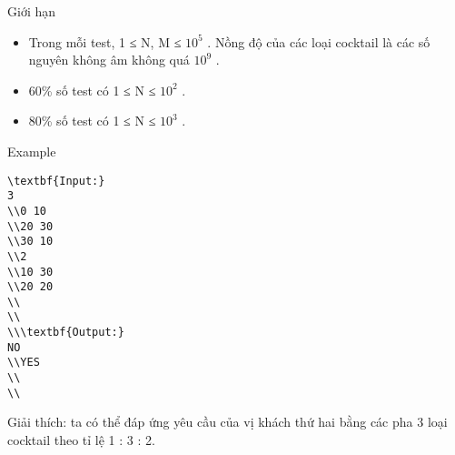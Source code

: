 Giới hạn
\begin{itemize}
	\item     Trong mỗi test, 1 ≤ N, M ≤ $10^{5}$    . Nồng độ của các loại cocktail là các số nguyên không âm không quá $10^{9}$    .   
	\item     60\% số test có 1 ≤ N ≤ $10^{2}$    .   
	\item     80\% số test có 1 ≤ N ≤ $10^{3}$    .   
\end{itemize}
Example
\begin{verbatim}
\textbf{Input:}
3
\\0 10
\\20 30 
\\30 10
\\2
\\10 30
\\20 20
\\
\\
\\\textbf{Output:}
NO
\\YES
\\
\\\end{verbatim}

Giải thích: ta có thể đáp ứng yêu cầu của vị khách thứ hai bằng các pha 3 loại cocktail theo tỉ lệ 1 : 3 : 2.